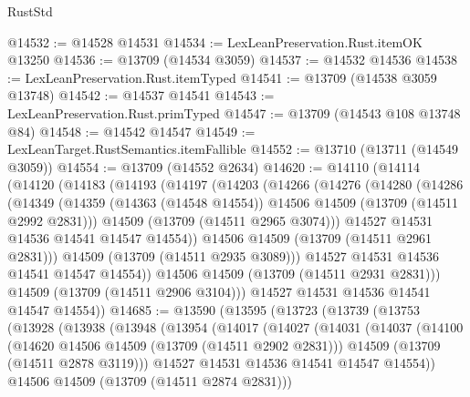 \begin{lexlean}{RustStd}
\begin{coremodule}
@14532 := @14528 @14531
@14534 := LexLeanPreservation.Rust.itemOK @13250
@14536 := @13709 (@14534 @3059)
@14537 := @14532 @14536
@14538 := LexLeanPreservation.Rust.itemTyped
@14541 := @13709 (@14538 @3059 @13748)
@14542 := @14537 @14541
@14543 := LexLeanPreservation.Rust.primTyped
@14547 := @13709 (@14543 @108 @13748 @84)
@14548 := @14542 @14547
@14549 := LexLeanTarget.RustSemantics.itemFallible
@14552 := @13710 (@13711 (@14549 @3059))
@14554 := @13709 (@14552 @2634)
@14620 := @14110
    (@14114
      (@14120
        (@14183
          (@14193
            (@14197
              (@14203
                (@14266
                  (@14276
                    (@14280
                      (@14286
                        (@14349
                          (@14359
                            (@14363 (@14548 @14554))
                            @14506
                            @14509
                            (@13709 (@14511 @2992 @2831)))
                          @14509
                          (@13709 (@14511 @2965 @3074)))
                        @14527
                        @14531
                        @14536
                        @14541
                        @14547
                        @14554))
                    @14506
                    @14509
                    (@13709 (@14511 @2961 @2831)))
                  @14509
                  (@13709 (@14511 @2935 @3089)))
                @14527
                @14531
                @14536
                @14541
                @14547
                @14554))
            @14506
            @14509
            (@13709 (@14511 @2931 @2831)))
          @14509
          (@13709 (@14511 @2906 @3104)))
        @14527
        @14531
        @14536
        @14541
        @14547
        @14554))
@14685 := @13590
    (@13595
      (@13723
        (@13739
          (@13753
            (@13928
              (@13938
                (@13948
                  (@13954
                    (@14017
                      (@14027
                        (@14031
                          (@14037
                            (@14100
                              (@14620 @14506 @14509 (@13709 (@14511 @2902 @2831)))
                              @14509
                              (@13709 (@14511 @2878 @3119)))
                            @14527
                            @14531
                            @14536
                            @14541
                            @14547
                            @14554))
                        @14506
                        @14509
                        (@13709 (@14511 @2874 @2831)))

\end{coremodule}
\end{lexlean}
